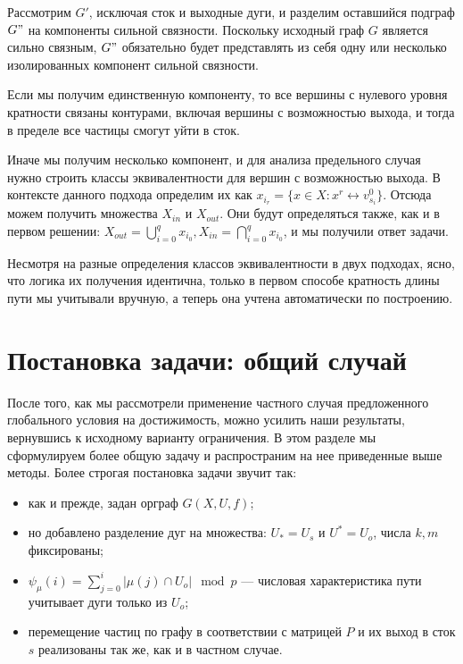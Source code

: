 Рассмотрим $G'$, исключая сток и выходные дуги, и разделим оставшийся подграф $G"$ на компоненты сильной связности. %
Поскольку исходный граф $G$ является сильно связным, $G"$ обязательно будет представлять из себя одну или несколько изолированных компонент сильной связности. %

Если мы получим единственную компоненту, то все вершины с нулевого уровня кратности связаны контурами, включая вершины с возможностью выхода, и тогда в пределе все частицы смогут уйти в сток. 

Иначе мы получим несколько компонент, и для анализа предельного случая нужно строить классы эквивалентности для вершин с возможностью выхода. В контексте данного подхода определим их как $x_{i_r} = \{x \in X: x^r \leftrightarrow v^0_{s_i} \}$. Отсюда можем получить множества $X_{in}$ и $X_{out}$. Они будут определяться также, как и в первом решении: $X_{out} = \bigcup_{i=0}^q x_{i_0}, X_{in} = \bigcap_{i=0}^q x_{i_0}$, и мы получили ответ задачи. 

Несмотря на разные определения классов эквивалентности в двух подходах, ясно, что логика их получения идентична, только в первом способе кратность длины пути мы учитывали вручную, а теперь она учтена автоматически по построению. 


\section{Постановка задачи: общий случай}

После того, как мы рассмотрели применение частного случая предложенного глобального условия на достижимость, можно усилить наши результаты, вернувшись к исходному варианту ограничения. В этом разделе мы сформулируем более общую задачу и распространим на нее приведенные выше методы. Более строгая постановка задачи звучит так: 	

\begin{itemize}
	\item как и прежде, задан орграф $G(X,U,f)$;
	\item но добавлено разделение дуг на множества: $U_* = U_s$ и $U^* = U_o$, числа $k, m$ фиксированы;
	\item $\psi_\mu(i) = \sum_{j=0}^i | \mu(j) \cap U_o | \mod p$ --- числовая характеристика пути учитывает дуги только из $U_o$; 
	\item перемещение частиц по графу в соответствии с матрицей $P$ и их выход в сток $s$ реализованы так же, как и в частном случае.
\end{itemize}

